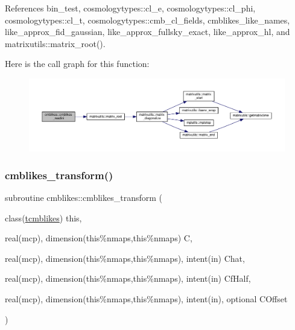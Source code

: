 References bin\+\_\+test, cosmologytypes\+::cl\+\_\+e, cosmologytypes\+::cl\+\_\+phi, cosmologytypes\+::cl\+\_\+t, cosmologytypes\+::cmb\+\_\+cl\+\_\+fields, cmblikes\+\_\+like\+\_\+names, like\+\_\+approx\+\_\+fid\+\_\+gaussian, like\+\_\+approx\+\_\+fullsky\+\_\+exact, like\+\_\+approx\+\_\+hl, and matrixutils\+::matrix\+\_\+root().

Here is the call graph for this function\+:
\nopagebreak
\begin{figure}[H]
\begin{center}
\leavevmode
\includegraphics[width=350pt]{namespacecmblikes_a0a856ee69d8586f1b224e56f86016346_cgraph}
\end{center}
\end{figure}
\mbox{\label{namespacecmblikes_a94f791a78bfa0b35f813dc792796de0d}} 
\subsubsection{\texorpdfstring{cmblikes\+\_\+transform()}{cmblikes\_transform()}}
{\footnotesize\ttfamily subroutine cmblikes\+::cmblikes\+\_\+transform (\begin{DoxyParamCaption}\item[{class(\mbox{\hyperlink{structcmblikes_1_1tcmblikes}{tcmblikes}})}]{this,  }\item[{real(mcp), dimension(this\%nmaps,this\%nmaps)}]{C,  }\item[{real(mcp), dimension(this\%nmaps,this\%nmaps), intent(in)}]{Chat,  }\item[{real(mcp), dimension(this\%nmaps,this\%nmaps), intent(in)}]{Cf\+Half,  }\item[{real(mcp), dimension(this\%nmaps,this\%nmaps), intent(in), optional}]{C\+Offset }\end{DoxyParamCaption})\hspace{0.3cm}{\ttfamily [private]}}



